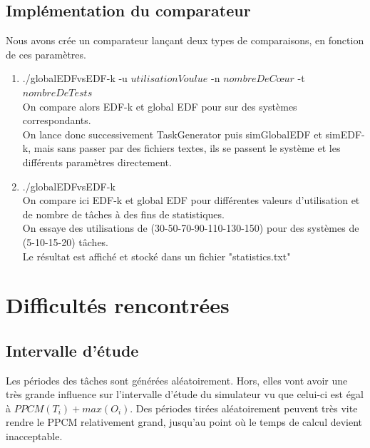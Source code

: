 \documentclass[a4paper,10pt]{article}
\begin{document}
	\subsection{Implémentation du comparateur}
		Nous avons crée un comparateur lançant deux types de comparaisons, en fonction de ces paramètres.
		\begin{enumerate}
			\item ./globalEDFvsEDF-k -u $utilisationVoulue$ -n $nombreDeCœur$ -t $nombreDeTests$\\
					On compare alors EDF-k et global EDF pour sur des systèmes correspondants.\\
					On lance donc successivement TaskGenerator puis simGlobalEDF et simEDF-k, mais sans passer par des fichiers textes, ils se passent le système et les différents paramètres directement.
			\item ./globalEDFvsEDF-k\\
					On compare ici EDF-k et global EDF pour différentes valeurs d'utilisation et de nombre de tâches à des fins de statistiques.\\
					On essaye des utilisations de (30-50-70-90-110-130-150) pour des systèmes de (5-10-15-20) tâches.\\
					Le résultat est affiché et stocké dans un fichier "statistics.txt"
		\end{enumerate}
		
		
\section{Difficultés rencontrées}

	\subsection{Intervalle d'étude}

		Les périodes des tâches sont générées aléatoirement. Hors, elles vont avoir une très grande influence sur l'intervalle d'étude du simulateur vu que 		celui-ci est égal à $PPCM(T_i)+ max(O_i)$. Des périodes tirées aléatoirement peuvent très vite rendre le PPCM relativement grand, jusqu'au point où 		le temps de calcul devient inacceptable.
\end{document}
